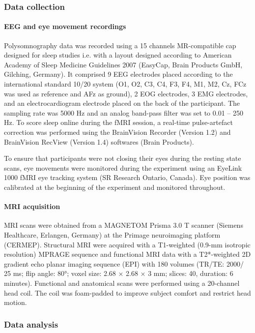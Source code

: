 \subsubsection*{Data collection}
\paragraph{EEG and eye movement recordings}
Polysomnography data was recorded using a 15 channels MR-compatible cap designed for sleep studies i.e. with a layout designed according to American Academy of Sleep Medicine Guidelines 2007 (EasyCap, Brain Products GmbH, Gilching, Germany). It comprised 9 EEG electrodes placed according to the international standard 10/20 system (O1, O2, C3, C4, F3, F4, M1, M2, Cz, FCz was used as reference and AFz as ground), 2 EOG electrodes, 3 EMG electrodes, and an electrocardiogram electrode placed on the back of the participant. The sampling rate was 5000 Hz and an analog band-pass filter was set to 0.01 – 250 Hz.  To score sleep online during the fMRI session, a real-time pulse-artefact correction was performed using the BrainVision Recorder (Version 1.2) and BrainVision RecView (Version 1.4) softwares (Brain Products).

To ensure that participants were not closing their eyes during the resting state scans, eye movements were monitored during the experiment using an EyeLink 1000 fMRI eye tracking system (SR Research Ontario, Canada). Eye position was calibrated at the beginning of the experiment and monitored throughout.

\paragraph{MRI acquisition}
MRI scans were obtained from a MAGNETOM Prisma 3.0 T scanner (Siemens Healthcare, Erlangen, Germany) at the Primage neuroimaging platform (CERMEP). Structural MRI were acquired with a T1-weighted (0.9-mm isotropic resolution) MPRAGE sequence and functional MRI data with a T2*-weighted 2D gradient echo planar imaging sequence (EPI) with 180 volumes (TR/TE: 2000/ 25 ms; flip angle: 80°; voxel size: 2.68 × 2.68 × 3 mm; slices: 40, duration: 6 minutes). Functional and anatomical scans were performed using a 20-channel head coil. The coil was foam-padded to improve subject comfort and restrict head motion.

\subsubsection*{Data analysis}
